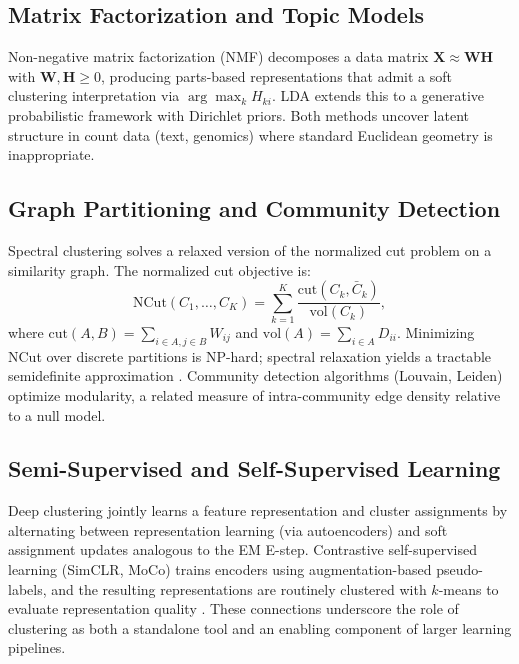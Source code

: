 \documentclass[conference]{IEEEtran}
\begin{document}
\subsection{Matrix Factorization and Topic Models}

Non-negative matrix factorization (NMF) \cite{lee1999learning} decomposes a data matrix $\mathbf{X} \approx \mathbf{W}\mathbf{H}$ with $\mathbf{W}, \mathbf{H} \geq 0$, producing parts-based representations that admit a soft clustering interpretation via $\arg\max_k H_{ki}$. LDA \cite{blei2003latent} extends this to a generative probabilistic framework with Dirichlet priors. Both methods uncover latent structure in count data (text, genomics) where standard Euclidean geometry is inappropriate.

\subsection{Graph Partitioning and Community Detection}

Spectral clustering solves a relaxed version of the normalized cut problem on a similarity graph. The normalized cut objective is:
\begin{equation}
\mathrm{NCut}(C_1, \ldots, C_K) = \sum_{k=1}^K \frac{\mathrm{cut}(C_k, \bar{C}_k)}{\mathrm{vol}(C_k)},
\end{equation}
where $\mathrm{cut}(A,B) = \sum_{i \in A, j \in B}W_{ij}$ and $\mathrm{vol}(A) = \sum_{i \in A}D_{ii}$. Minimizing NCut over discrete partitions is NP-hard; spectral relaxation yields a tractable semidefinite approximation \cite{shi2000normalized}. Community detection algorithms (Louvain, Leiden) optimize modularity, a related measure of intra-community edge density relative to a null model.

\subsection{Semi-Supervised and Self-Supervised Learning}

Deep clustering \cite{xie2016unsupervised} jointly learns a feature representation and cluster assignments by alternating between representation learning (via autoencoders) and soft assignment updates analogous to the EM E-step. Contrastive self-supervised learning (SimCLR, MoCo) trains encoders using augmentation-based pseudo-labels, and the resulting representations are routinely clustered with $k$-means to evaluate representation quality \cite{chen2020simple}. These connections underscore the role of clustering as both a standalone tool and an enabling component of larger learning pipelines.
\end{document}

